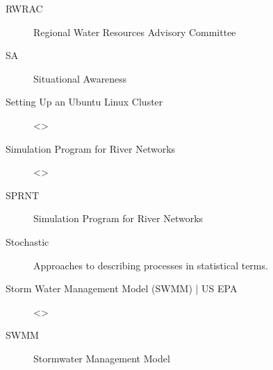 \documentclass[letterpaper,10pt,english]{sphinxmanual}
\begin{document}
\begin{description}
\item[{RWRAC\label{\detokenize{glossary:term-RWRAC}}}] \leavevmode
\sphinxAtStartPar
Regional Water Resources Advisory Committee

\item[{SA\label{\detokenize{glossary:term-SA}}}] \leavevmode
\sphinxAtStartPar
Situational Awareness

\item[{Setting Up an Ubuntu Linux Cluster\label{\detokenize{glossary:term-Setting-Up-an-Ubuntu-Linux-Cluster}}}] \leavevmode
\sphinxAtStartPar
\textless{}\textgreater{}

\item[{Simulation Program for River Networks\label{\detokenize{glossary:term-Simulation-Program-for-River-Networks}}}] \leavevmode
\sphinxAtStartPar
\textless{}\textgreater{}

\item[{SPRNT\label{\detokenize{glossary:term-SPRNT}}}] \leavevmode
\sphinxAtStartPar
Simulation Program for River Networks

\item[{Stochastic\label{\detokenize{glossary:term-Stochastic}}}] \leavevmode
\sphinxAtStartPar
Approaches to describing processes in statistical terms.

\item[{Storm Water Management Model (SWMM) | US EPA\label{\detokenize{glossary:term-Storm-Water-Management-Model-SWMM-US-EPA}}}] \leavevmode
\sphinxAtStartPar
\textless{}\textgreater{}

\item[{SWMM\label{\detokenize{glossary:term-SWMM}}}] \leavevmode
\sphinxAtStartPar
Stormwater Management Model


\end{description}
\end{document}
